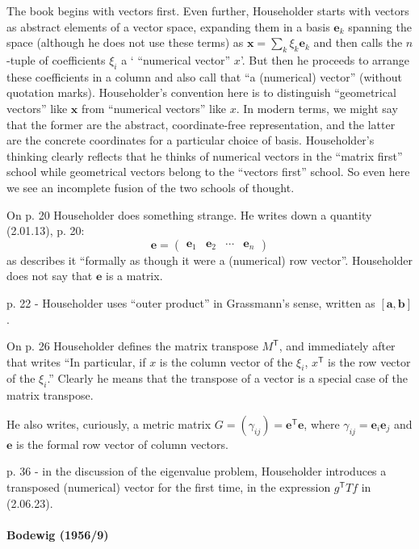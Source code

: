 The book begins with vectors first. Even further, Householder starts with
vectors as abstract elements of a vector space, expanding them in a basis
$\mathbf e_k$ spanning the space (although he does not use these terms) as
$\mathbf x = \sum_k \xi_k \mathbf e_k$ and then calls the $n$-tuple of
coefficients $\xi_i$ a ` ``numerical vector'' $x$'. But then he proceeds to
arrange these coefficients in a column and also call that ``a (numerical)
vector'' (without quotation marks).
Householder's convention here is to distinguish  ``geometrical vectors'' like
$\mathbf x$ from ``numerical vectors'' like $x$. In modern terms, we might say
that the former are the abstract, coordinate-free representation, and the
latter are the concrete coordinates for a particular choice of basis.
Householder's thinking clearly reflects that he thinks of numerical vectors in
the ``matrix first'' school while geometrical vectors belong to the ``vectors
first'' school. So even here we see an incomplete fusion of the two schools of
thought.

On p. 20 Householder does something strange. He writes down a quantity (2.01.13), p. 20:
\[
\mathbf e = \begin{pmatrix}\mathbf e_1 & \mathbf e_2 & \cdots & \mathbf e_n\end{pmatrix}
\]
as describes it ``formally as though it were a (numerical) row vector''.
Householder does not say that $\mathbf e$ is a matrix.

p. 22 - Householder uses ``outer product'' in Grassmann's sense, written as
$[\mathbf a, \mathbf b]$.

On p. 26 Householder defines the matrix transpose $M^{\mathsf T}$, and immediately
after that writes ``In particular, if $x$ is the column vector of the $\xi_i$,
$x^{\mathsf T}$ is the row vector of the $\xi_i$.'' Clearly he means that the
transpose of a vector is a special case of the matrix transpose.

He also writes, curiously, a metric matrix $G = (\gamma_{ij}) = \mathbf e^{\mathsf T} \mathbf e$,
where $\gamma_{ij} = \mathbf e_i \mathbf e_j$ and $\mathbf e$ is the formal row
vector of column vectors.

p. 36 - in the discussion of the eigenvalue problem, Householder introduces a
transposed (numerical) vector for the first time, in the expression $g^{\mathsf
T}Tf$ in (2.06.23).



\paragraph{Bodewig (1956/9)~\cite{Bodewig1956}}

